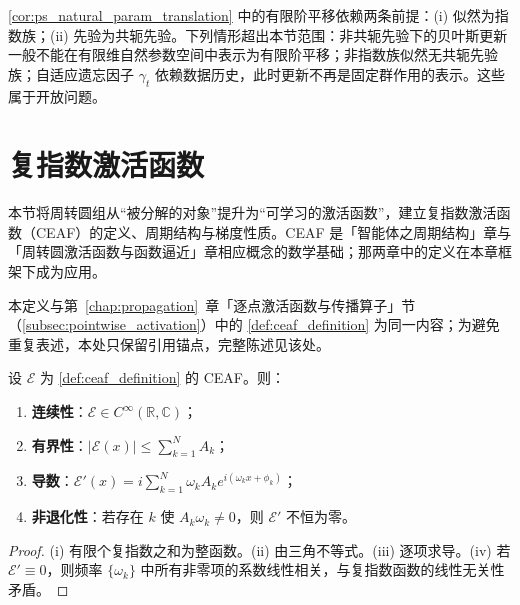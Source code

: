 \begin{remark}[贝叶斯更新的开放问题]\label{rem:bayes-open-problems}
\cref{cor:ps_natural_param_translation} 中的有限阶平移依赖两条前提：(i) 似然为指数族；(ii) 先验为共轭先验。下列情形超出本节范围：非共轭先验下的贝叶斯更新一般不能在有限维自然参数空间中表示为有限阶平移；非指数族似然无共轭先验族；自适应遗忘因子 $\gamma_t$ 依赖数据历史，此时更新不再是固定群作用的表示。这些属于开放问题。
\end{remark}

\section{复指数激活函数}\label{sec:ps_ceaf}

\begin{remark}[本节定位]\label{rem:ceaf-positioning}
本节将周转圆组从“被分解的对象”提升为“可学习的激活函数”，建立复指数激活函数（CEAF）的定义、周期结构与梯度性质。CEAF 是「智能体之周期结构」章与「周转圆激活函数与函数逼近」章相应概念的数学基础；那两章中的定义在本章框架下成为应用。
\end{remark}

\begin{definition}[复指数激活函数]\label{def:ceaf_definition_ps}
本定义与第~\ref{chap:propagation}~章「逐点激活函数与传播算子」节（\cref{subsec:pointwise_activation}）中的 \cref{def:ceaf_definition} 为同一内容；为避免重复表述，本处只保留引用锚点，完整陈述见该处。
\end{definition}

\begin{proposition}\label{prop:ceaf_basic}
设 $\mathcal{E}$ 为 \cref{def:ceaf_definition} 的 CEAF。则：
\begin{enumerate}[label=(\roman*)]
    \item \textbf{连续性}：$\mathcal{E}\in C^\infty(\mathbb{R},\mathbb{C})$；
    \item \textbf{有界性}：$|\mathcal{E}(x)|\le\sum_{k=1}^{N}A_k$；
    \item \textbf{导数}：$\mathcal{E}'(x) = i\sum_{k=1}^{N}\omega_k A_k e^{i(\omega_k x+\phi_k)}$；
    \item \textbf{非退化性}：若存在 $k$ 使 $A_k\omega_k\neq 0$，则 $\mathcal{E}'$ 不恒为零。
\end{enumerate}
\end{proposition}

\begin{proof}
(i) 有限个复指数之和为整函数。(ii) 由三角不等式。(iii) 逐项求导。(iv) 若 $\mathcal{E}'\equiv 0$，则频率 $\{\omega_k\}$ 中所有非零项的系数线性相关，与复指数函数的线性无关性矛盾。
\end{proof}

